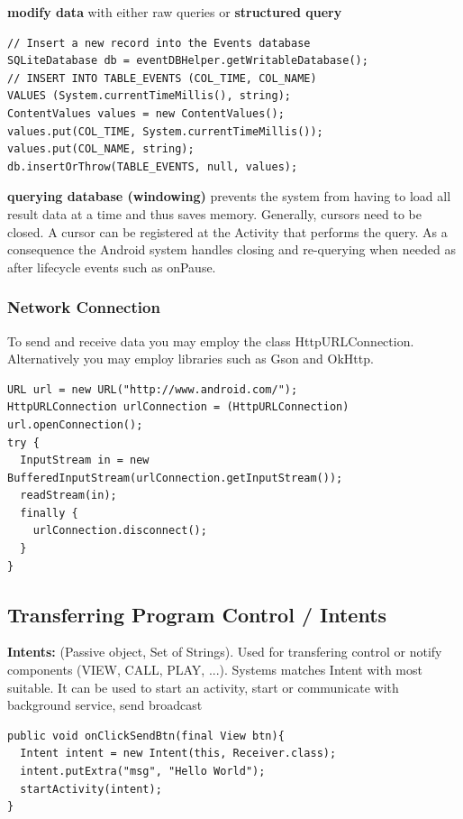 \textbf{modify data} with either raw queries or \textbf{structured query}
\begin{lstlisting}
// Insert a new record into the Events database
SQLiteDatabase db = eventDBHelper.getWritableDatabase();
// INSERT INTO TABLE_EVENTS (COL_TIME, COL_NAME)
VALUES (System.currentTimeMillis(), string);
ContentValues values = new ContentValues();
values.put(COL_TIME, System.currentTimeMillis());
values.put(COL_NAME, string);
db.insertOrThrow(TABLE_EVENTS, null, values);
\end{lstlisting}

\textbf{querying database (windowing)} prevents the system from having to load
all result data at a time and thus saves memory. Generally, cursors need to be
closed. A cursor can be registered at the Activity that performs the query. As
a consequence the Android system handles closing and re-querying when needed as
after lifecycle events such as onPause.

\subsubsection{Network Connection}
To send and receive data you may employ the class HttpURLConnection.
Alternatively you may employ libraries such as Gson and OkHttp.

\begin{lstlisting}
URL url = new URL("http://www.android.com/");
HttpURLConnection urlConnection = (HttpURLConnection)
url.openConnection();
try {
  InputStream in = new BufferedInputStream(urlConnection.getInputStream());
  readStream(in);
  finally {
    urlConnection.disconnect();
  }
}
\end{lstlisting}

\subsection{Transferring Program Control / Intents}
\textbf{Intents:} (Passive object, Set of Strings). Used for transfering
control or notify components (VIEW, CALL, PLAY, ...). Systems matches Intent
with most suitable. It can be used to start an activity, start or communicate
with background service, send broadcast

\begin{lstlisting}
public void onClickSendBtn(final View btn){
  Intent intent = new Intent(this, Receiver.class);
  intent.putExtra("msg", "Hello World");
  startActivity(intent);
}
\end{lstlisting}

